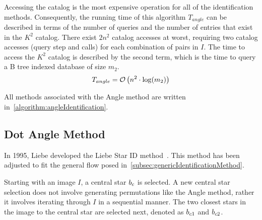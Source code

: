 Accessing the catalog is the most expensive operation for all of the identification methods.
Consequently, the running time of this algorithm $T_{angle}$ can be described in terms of the number of queries and
the number of entries that exist in the $K^2$ catalog.
There exist $2n^2$ catalog accesses at worst, requiring two catalog accesses (query step and  calls) for
each combination of pairs in $I$.
The time to access the $K^2$ catalog is described by the second term, which is the time to query a B tree
indexed database of size $m_2$.
\begin{equation}\label{eq:complexityAngle}
    T_{angle} = \bigO\left( n^2 \cdot \log(m_2) \right)
\end{equation}

All methods associated with the Angle method are written in~\autoref{algorithm:angleIdentification}.

\subsection{Dot Angle Method}\label{subsec:dotAngleMethod}
In 1995, Liebe developed the Liebe Star ID method~\cite{Survey,AnalysisUncompensated}.
This method has been adjusted to fit the general flow posed in~\autoref{subsec:genericIdentificationMethod}.

Starting with an image $I$, a central star $b_c$ is selected.
A new central star selection does not involve generating permutations like the Angle method, rather it involves
iterating through $I$ in a sequential manner.
The two closest stars in the image to the central star are selected next, denoted as $b_{c1}$ and $b_{c2}$.

